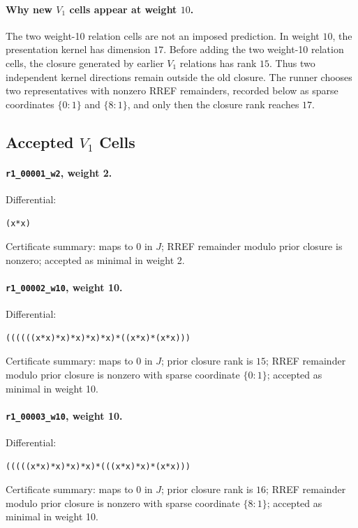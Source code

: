 \documentclass[11pt]{article}
\begin{document}
\paragraph{Why new \(V_1\) cells appear at weight \(10\).}
The two weight-10 relation cells are not an imposed prediction.  In weight
\(10\), the presentation kernel has dimension \(17\).  Before adding the two
weight-10 relation cells, the closure generated by earlier \(V_1\) relations
has rank \(15\).  Thus two independent kernel directions remain outside the
old closure.  The runner chooses two representatives with nonzero RREF
remainders, recorded below as sparse coordinates \(\{0:1\}\) and
\(\{8:1\}\), and only then the closure rank reaches \(17\).

\subsection*{Accepted \(V_1\) Cells}

\paragraph{\texttt{r1\_00001\_w2}, weight 2.}
Differential:
\begin{lstlisting}
(x*x)
\end{lstlisting}
Certificate summary: maps to \(0\) in \(J\); RREF remainder modulo prior
closure is nonzero; accepted as minimal in weight 2.

\paragraph{\texttt{r1\_00002\_w10}, weight 10.}
Differential:
\begin{lstlisting}
((((((x*x)*x)*x)*x)*x)*((x*x)*(x*x)))
\end{lstlisting}
Certificate summary: maps to \(0\) in \(J\); prior closure rank is \(15\);
RREF remainder modulo prior closure is nonzero with sparse coordinate
\(\{0:1\}\); accepted as minimal in weight 10.

\paragraph{\texttt{r1\_00003\_w10}, weight 10.}
Differential:
\begin{lstlisting}
(((((x*x)*x)*x)*x)*(((x*x)*x)*(x*x)))
\end{lstlisting}
Certificate summary: maps to \(0\) in \(J\); prior closure rank is \(16\);
RREF remainder modulo prior closure is nonzero with sparse coordinate
\(\{8:1\}\); accepted as minimal in weight 10.
\end{document}
